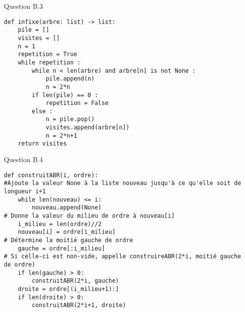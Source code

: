 \documentclass[10pt]{beamer}
\begin{document}
\begin{frame}[fragile]
	\mframe{\Arbre}
	\begin{exampleblock}{Question B.3}
			\begin{lstlisting}
def infixe(arbre: list) -> list:
    pile = []
    visites = []
    n = 1
    repetition = True
    while repetition :
        while n < len(arbre) and arbre[n] is not None :
            pile.append(n)
            n = 2*n
        if len(pile) == 0 :
            repetition = False
        else :
            n = pile.pop()
            visites.append(arbre[n])
            n = 2*n+1
    return visites
   		\end{lstlisting}
	\end{exampleblock}
\end{frame}


\begin{frame}[fragile]
	\mframe{\Arbre}
	\begin{exampleblock}{Question B.4}
			\begin{lstlisting}
def construitABR(i, ordre):
#Ajoute la valeur None à la liste nouveau jusqu'à ce qu'elle soit de longueur i+1
    while len(nouveau) <= i:
        nouveau.append(None)
# Donne la valeur du milieu de ordre à nouveau[i]
    i_milieu = len(ordre)//2
    nouveau[i] = ordre[i_milieu]
# Détermine la moitié gauche de ordre
    gauche = ordre[:i_milieu]
# Si celle-ci est non-vide, appelle construireABR(2*i, moitié gauche de ordre)
    if len(gauche) > 0:
        construitABR(2*i, gauche)
    droite = ordre[(i_milieu+1):]
    if len(droite) > 0:
        construitABR(2*i+1, droite)
   		\end{lstlisting}
	\end{exampleblock}
\end{frame}
\end{document}
